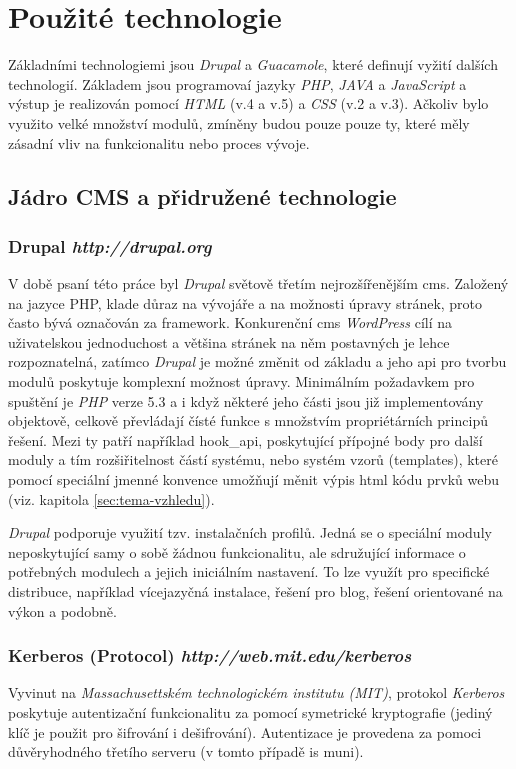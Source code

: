 \section{Použité technologie}
\label{sec:technologies}

Základními technologiemi jsou \emph{Drupal} a \emph{Guacamole}, které definují vyžití dalších technologií. Základem jsou programovaí jazyky \emph{PHP}, \emph{JAVA} a \emph{JavaScript} a výstup je realizován pomocí \emph{HTML} (v.4 a v.5) a \emph{CSS} (v.2 a v.3). Ačkoliv bylo využito velké množství modulů, zmíněny budou pouze pouze ty, které měly zásadní vliv na funkcionalitu nebo proces vývoje.

\subsection{Jádro CMS a přidružené technologie}

\subsubsection*{\textbf{Drupal} \hfill \emph{http://drupal.org}} 
\label{subsec:drupal}
V době psaní této práce byl \emph{Drupal} světově třetím nejrozšířenějším \gls{cms}\cite{website:cms-market-share}. Založený na jazyce PHP, klade důraz na vývojáře a na možnosti úpravy stránek, proto často bývá označován za \gls{framework}. Konkurenční \gls{cms} \emph{WordPress} cílí na uživatelskou jednoduchost a většina stránek na něm postavných je lehce rozpoznatelná, zatímco \emph{Drupal} je možné změnit od základu a jeho \gls{api} pro tvorbu modulů poskytuje komplexní možnost úpravy. Minimálním požadavkem pro spuštění je \emph{PHP} verze 5.3 a i když některé jeho části jsou již implementovány objektově, celkově převládají čísté funkce s množstvím propriétárních principů řešení. Mezi ty patří například hook\_api, poskytující přípojné body pro další moduly a tím rozšiřitelnost částí systému, nebo systém vzorů (templates), které pomocí speciální jmenné konvence umožňují měnit výpis html kódu prvků webu (viz. kapitola \ref{sec:tema-vzhledu}).

\emph{Drupal} podporuje využití tzv. instalačních profilů. Jedná se o speciální moduly neposkytující samy o sobě žádnou funkcionalitu, ale sdružující informace o potřebných modulech a jejich iniciálním nastavení. To lze využít pro specifické distribuce, například vícejazyčná instalace, řešení pro blog, řešení orientované na výkon a podobně.

\subsubsection*{\textbf{Kerberos} (Protocol) \hfill \emph{http://web.mit.edu/kerberos}}
Vyvinut na \emph{Massachusettském technologickém institutu (MIT)}, protokol \emph{Kerberos} poskytuje autentizační funkcionalitu za pomocí symetrické kryptografie (jediný klíč je použit pro šifrování i dešifrování). Autentizace je provedena za pomoci důvěryhodného třetího serveru (v tomto případě \gls{is} \gls{muni}). %


